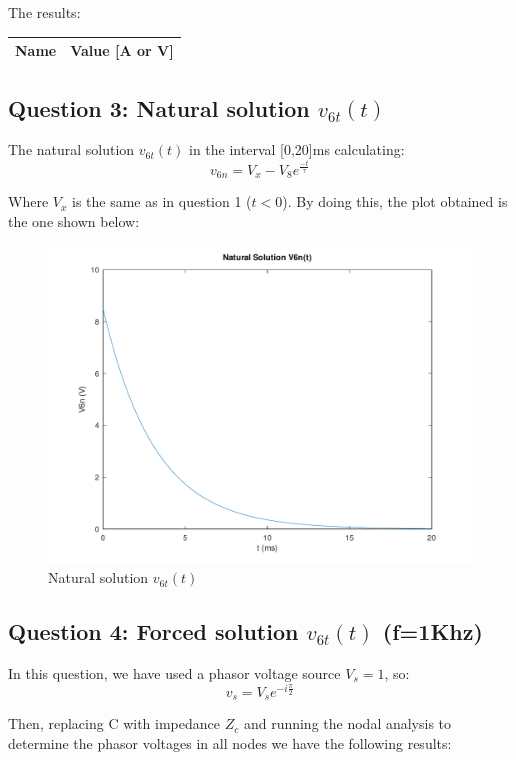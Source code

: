 The results:

\begin{center}
  \begin{tabular}{ | c | c | }
    \hline    
    {\bf Name} & {\bf Value [A or V]} \\ \hline
    
    \hline
  \end{tabular}
\end{center}


\subsection{Question 3: Natural solution $v_{6t}(t)$}
The natural solution $v_{6t}(t)$ in the interval [0,20]ms calculating:
\begin{equation}
     v_{6n} = {V_x-V_8}e^{\frac{-t}{\tau}}
\end{equation}\par
Where $V_x$ is the same as in question 1 ($t<0$).
By doing this, the plot obtained is the one shown below:

\begin{figure}[H] \centering
\includegraphics[width=0.7\linewidth]{../mat/alinea3.pdf}
\caption{Natural solution $v_{6t}(t)$}
\label{fig:plot3}
\end{figure}


\subsection{Question 4: Forced solution $v_{6t}(t)$ (f=1Khz)}
In this question, we have used a phasor voltage source $V_s = 1$, so:
\begin{equation}
     v_s = {V_s}e^{-i\frac{\pi}{2}}
\end{equation}\par
Then, replacing C with  impedance $Z_c$ and running the nodal analysis to determine the phasor voltages in all nodes we have the following results:\par

